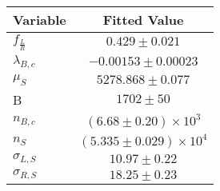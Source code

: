 \begin{tabular}[t]{lc}
\hline
Variable &Fitted Value\\
\hline\hline
$f_{\frac{L}{R}}$&$0.429\pm0.021$\\
\hline
$\lambda_{B,c}$&$-0.00153\pm0.00023$\\
\hline
$\mu_S$&$5278.868\pm0.077$\\
\hline
B&$1702\pm50$\\
\hline
$n_{B,c}$&$(6.68\pm0.20)\times 10^3$\\
\hline
$n_S$&$(5.335\pm0.029)\times 10^4$\\
\hline
$\sigma_{L, S}$&$10.97\pm0.22$\\
\hline
$\sigma_{R, S}$&$18.25\pm0.23$\\
\hline
\end{tabular}